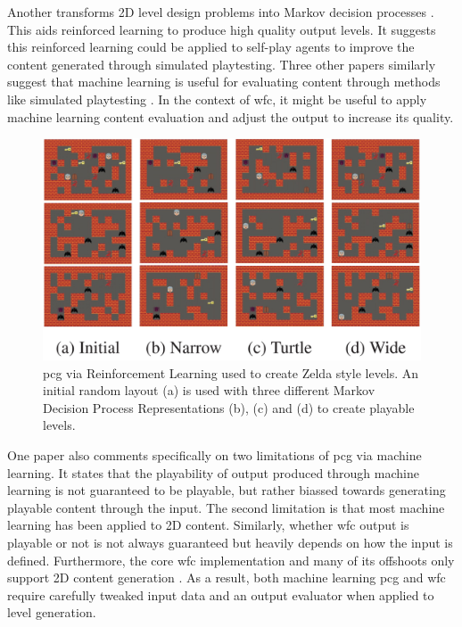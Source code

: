 Another transforms 2D level design problems into Markov decision processes \cite{Markov_PCGRL}. This aids reinforced learning to produce high quality output levels. It suggests this reinforced learning could be applied to self-play agents to improve the content generated through simulated playtesting. Three other papers similarly suggest that machine learning is useful for evaluating content through methods like simulated playtesting \cite{DeepLearningPCG, VGDL_ASP, PCGML}. In the context of \acrshort{wfc}, it might be useful to apply machine learning content evaluation and adjust the output to increase its quality.

\begin{figure}[H]
    \centering
    \includegraphics[width=\textwidth, height=0.3\textheight, keepaspectratio]{Images/PCGRL.jpg}
    \caption{\acrlong{pcg} via Reinforcement Learning used to create Zelda style levels. An initial random layout (a) is used with three different Markov Decision Process Representations (b), (c) and (d) to create playable levels. \cite{Markov_PCGRL}}
    \label{fig:pcgrl}
\end{figure}

One paper \cite{PCGML} also comments specifically on two limitations of \acrshort{pcg} via machine learning. It states that the playability of output produced through machine learning is not guaranteed to be playable, but rather biassed towards generating playable content through the input. The second limitation is that most machine learning has been applied to 2D content. Similarly, whether \acrshort{wfc} output is playable or not is not always guaranteed but heavily depends on how the input is defined. Furthermore, the core \acrshort{wfc} implementation and many of its offshoots only support 2D content generation \cite{Gumin_Wave_Function_Collapse_2016}. As a result, both machine learning \acrshort{pcg} and \acrshort{wfc} require carefully tweaked input data and an output evaluator when applied to level generation.

